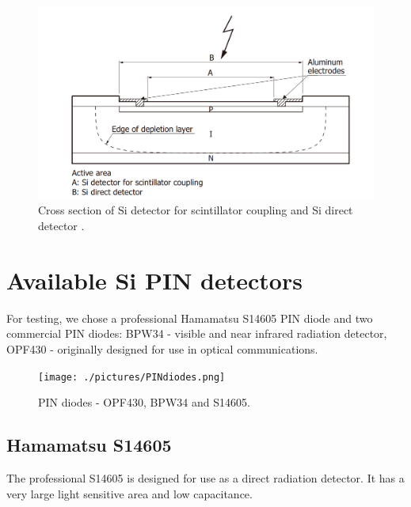 \begin{figure}[H]
 \centering
 \includegraphics[scale=0.35, angle = 0]{./pictures/SiPINScheme.png}
 \caption{Cross section of Si detector for scintillator coupling and Si direct detector \cite{SiPINdirect}.}
 \label{SiPIN}
 
\end{figure}



\section{Available Si PIN detectors}
For testing, we chose a professional Hamamatsu S14605 PIN diode and two commercial PIN diodes: BPW34 - visible and near infrared radiation detector, OPF430 - originally designed for use in optical communications.

\begin{figure}[H]
 \centering
 \texttt{[image: ./pictures/PINdiodes.png]}
 \caption{PIN diodes - OPF430, BPW34 and S14605.}
 \label{PIN diodes}

\end{figure}

\subsection{Hamamatsu S14605}
The professional S14605 is designed for use as a direct radiation detector. It has a very large light sensitive area and low capacitance.

